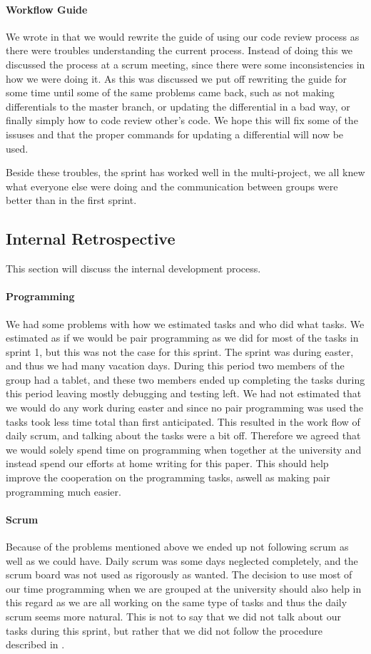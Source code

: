 \paragraph{Workflow Guide}
We wrote in  that we would rewrite the guide of using our code review process as there were troubles understanding the current process.
Instead of doing this we discussed the process at a scrum meeting, since there were some inconsistencies in how we were doing it.
As this was discussed we put off rewriting the guide for some time until some of the same problems came back, such as not making differentials to the master branch, or updating the differential in a bad way, or finally simply how to code review other's code.
We hope this will fix some of the issuses and that the proper commands for updating a differential will now be used.

Beside these troubles, the sprint has worked well in the multi-project, we all knew what everyone else were doing and the communication between groups were better than in the first sprint.

\subsection{Internal Retrospective}
This section will discuss the internal development process.
\paragraph{Programming}
We had some problems with how we estimated tasks and who did what tasks.
We estimated as if we would be pair programming as we did for most of the tasks in sprint 1, but this was not the case for this sprint.
The sprint was during easter, and thus we had many vacation days.
During this period two members of the group had a tablet, and these two members ended up completing the tasks during this period leaving mostly debugging and testing left.
We had not estimated that we would do any work during easter and since no pair programming was used the tasks took less time total than first anticipated.
This resulted in the work flow of daily scrum, and talking about the tasks were a bit off.
Therefore we agreed that we would solely spend time on programming when together at the university and instead spend our efforts at home writing for this paper.
This should help improve the cooperation on the programming tasks, aswell as making pair programming much easier.

\paragraph{Scrum}
Because of the problems mentioned above we ended up not following scrum as well as we could have.
Daily scrum was some days neglected completely, and the scrum board was not used as rigorously as wanted.
The decision to use most of our time programming when we are grouped at the university should also help in this regard as we are all working on the same type of tasks and thus the daily scrum seems more natural.
This is not to say that we did not talk about our tasks during this sprint, but rather that we did not follow the procedure described in .
